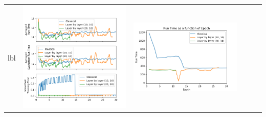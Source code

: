 \begin{longtable}[]{@{}llllll@{}}
lbl & \includegraphics{lbl_time.png} & \includegraphics{lbl_epoch.png} &

\end{longtable}
